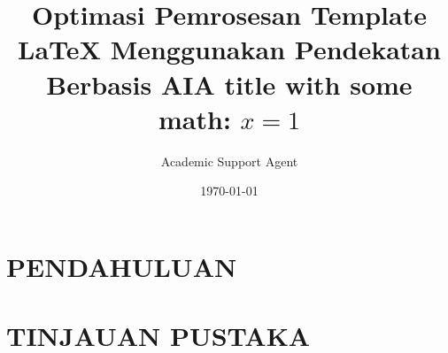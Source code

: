 \documentclass{article}
\title{Optimasi Pemrosesan Template LaTeX Menggunakan Pendekatan Berbasis AI}
\author{Academic Support Agent}
\date{\today}
\begin{document}
\maketitle

\begin{abstract}

\end{abstract}

\chapter{PENDAHULUAN}


\chapter{TINJAUAN PUSTAKA}


\usepackage{jinstpub} %
\usepackage{lineno}
\linenumbers




\title{\boldmath A title with some math: $x=1$}







\end{document}
